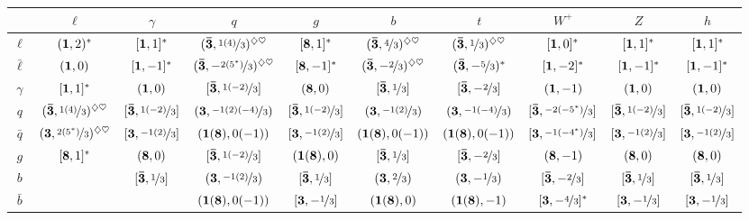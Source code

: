 \begin{table}
\begin{center}
\begin{adjustbox}{width=1\textwidth}
\begin{tabular}{cccccccccc} \hline\hline
& $\ell$ & $\gamma$ & $q$ & $g$ & $b$ & $t$ & $W^+$ & $Z$ & $h$ \\ \hline
$\ell$ & $(\mathbf{1}, 2)^*$ & $[\mathbf{1}, 1]^*$ & $(\mathbf{\bar 3}, \nicefrac{1(4)}{3})^{\diamondsuit\heartsuit}$& $[\mathbf{8}, 1]^*$& $(\mathbf{\bar 3}, \nicefrac{4}{3})^{\diamondsuit\heartsuit}$& $(\mathbf{\bar 3}, \nicefrac{1}{3})^{\diamondsuit\heartsuit}$& $[\mathbf{1}, 0]^*$& $[\mathbf{1}, 1]^*$ &$[\mathbf{1}, 1]^*$  \\  
$\bar \ell$ & $(\mathbf{1}, 0)$ & $[\mathbf{1}, -1]^*$ & $(\mathbf{\bar 3}, -\nicefrac{2(5^*)}{3})^{\diamondsuit\heartsuit}$& $[\mathbf{8}, -1]^*$& $(\mathbf{\bar 3}, -\nicefrac{2}{3})^{\diamondsuit\heartsuit}$& $(\mathbf{\bar 3}, -\nicefrac{5}{3})^*$& $[\mathbf{1}, -2]^*$ & $[\mathbf{1}, -1]^*$& $[\mathbf{1}, -1]^*$   \\ 
$\gamma$ & $[\mathbf{1}, 1]^*$ & $(\mathbf{1}, 0)$ & $[\mathbf{\bar 3}, \nicefrac{1(-2)}{3}]$ & $(\mathbf{8}, 0)$& $[\mathbf{\bar 3}, \nicefrac{1}{3}]$& $[\mathbf{\bar 3}, -\nicefrac{2}{3}]$ & $(\mathbf{1}, -1)$ & $(\mathbf{1}, 0)$ &  $(\mathbf{1}, 0)$ \\ 
$ q$ & $(\mathbf{\bar 3}, \nicefrac{1(4)}{3})^{\diamondsuit\heartsuit}$ & $[\mathbf{\bar 3}, \nicefrac{1(-2)}{3}]$ & $(\mathbf{3}, \nicefrac{-1(2)(-4)}{3})$ & $[\mathbf{\bar 3}, \nicefrac{1(-2)}{3}]$ & $(\mathbf{3}, \nicefrac{-1(2)}{3})$ & $(\mathbf{3}, \nicefrac{-1(-4)}{3})$ &  $[\mathbf{\bar 3}, \nicefrac{-2(-5^{*})}{3}]$&  $[\mathbf{\bar 3}, \nicefrac{1(-2)}{3}]$ &  $[\mathbf{\bar 3}, \nicefrac{1(-2)}{3}]$ \\ 
$ \bar q $ & $(\mathbf{3}, \nicefrac{2(5^*)}{3})^{\diamondsuit\heartsuit}$ & $[\mathbf{3}, \nicefrac{-1(2)}{3}]$& $(\mathbf{1(8)}, 0(-1))$ & $[\mathbf{3}, \nicefrac{-1(2)}{3}]$ & $(\mathbf{1(8)}, 0(-1))$ & $(\mathbf{1(8)}, 0(-1))$  & $[\mathbf{3}, \nicefrac{-1(-4^*)}{3}]$ & $[\mathbf{3}, \nicefrac{-1(2)}{3}]$ & $[\mathbf{3}, \nicefrac{-1(2)}{3}]$  \\ 
$g$ & $[\mathbf{8}, 1]^*$ & $(\mathbf{8}, 0)$ & $[\mathbf{\bar 3}, \nicefrac{1(-2)}{3}]$ & $(\mathbf{1(8)}, 0)$ & $[\mathbf{\bar 3}, \nicefrac{1}{3}]$ & $[\mathbf{\bar 3}, -\nicefrac{2}{3}]$ & $(\mathbf{8}, -1)$ &  $(\mathbf{8}, 0)$ &  $(\mathbf{8}, 0)$ \\ 
$b$ &  & $[\mathbf{\bar 3}, \nicefrac{1}{3}]$ & $(\mathbf{3}, \nicefrac{-1(2)}{3})$ & $[\mathbf{\bar 3}, \nicefrac{1}{3}]$ & $(\mathbf{3}, \nicefrac{2}{3})$ & $(\mathbf{3}, -\nicefrac{1}{3})$ & $[\mathbf{\bar 3}, -\nicefrac{2}{3}]$ & $[\mathbf{\bar 3}, \nicefrac{1}{3}]$ & $[\mathbf{\bar 3}, \nicefrac{1}{3}]$   \\  
$\bar b$ & & & $(\mathbf{1(8)}, 0(-1))$ & $[\mathbf{3}, -\nicefrac{1}{3}]$ & $(\mathbf{1(8)}, 0)$ & $(\mathbf{1(8)}, -1)$  & $[\mathbf{3}, -\nicefrac{4}{3}]^*$ & $[\mathbf{3}, -\nicefrac{1}{3}]$&  $[\mathbf{3}, -\nicefrac{1}{3}]$\\ 

\end{tabular}
\end{adjustbox}
\end{center}
\end{table}
